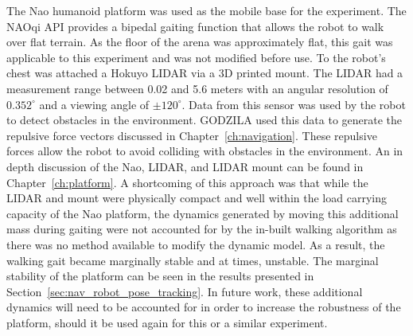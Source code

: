 The Nao humanoid platform was used as the mobile base for the experiment.
The NAOqi API provides a bipedal gaiting function that allows the robot to
walk over flat terrain. As the floor of the arena was approximately flat, this gait was
applicable to this experiment and was not modified before use.
To the robot's chest was attached a Hokuyo LIDAR via a 3D printed mount.
The LIDAR had a measurement range between 0.02 and 5.6 meters with an
angular resolution of $0.352^\circ$ and a viewing angle of $\pm 120^\circ$.
Data from this sensor was used by the robot to detect obstacles in the environment.
GODZILA used this data to generate the repulsive force vectors discussed in Chapter~\ref{ch:navigation}.
These repulsive forces allow the robot to avoid colliding with obstacles in the environment.
An in depth discussion of the Nao, LIDAR, and LIDAR mount can be found in 
Chapter~\ref{ch:platform}.
A shortcoming of this approach was that while the LIDAR and mount were physically
compact and well within the load carrying capacity of the Nao platform, the dynamics
generated by moving this additional mass during gaiting were not accounted for by the
in-built walking algorithm as there was no method available to modify the dynamic model.
As a result, the walking gait became marginally stable and at times, unstable.
The marginal stability of the platform can be seen in the results presented in 
Section~\ref{sec:nav_robot_pose_tracking}.
In future work, these additional dynamics will need to be accounted for in order to
increase the robustness of the platform, should it be used again for this or a similar
experiment.


